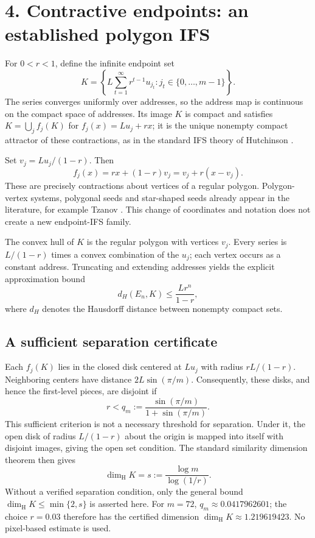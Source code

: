 \documentclass[11pt,a4paper]{article}
\newcommand{\dimH}{\dim_{\mathrm H}}
\newcommand{\sectiontitle}[1]{\section*{\sffamily\color{ink}#1}}
\begin{document}
\newpage
\sectiontitle{4. Contractive endpoints: an established polygon IFS}
For $0<r<1$, define the infinite endpoint set
\begin{equation}
K=\left\{L\sum_{t=1}^{\infty}r^{t-1}u_{j_t}:
j_t\in\{0,\ldots,m-1\}\right\}.
\end{equation}
The series converges uniformly over addresses, so the address map is
continuous on the compact space of addresses. Its image $K$ is compact and
satisfies $K=\bigcup_j f_j(K)$ for $f_j(x)=Lu_j+rx$; it is the unique
nonempty compact attractor of these contractions, as in the standard
IFS theory of Hutchinson \cite{hutchinson}.

Set $v_j=Lu_j/(1-r)$. Then
\begin{equation}
f_j(x)=rx+(1-r)v_j=v_j+r(x-v_j).
\end{equation}
These are precisely contractions about vertices of a regular polygon.
Polygon-vertex systems, polygonal seeds and star-shaped seeds already
appear in the literature, for example Tzanov \cite{tzanov}. This change
of coordinates and notation does not create a new endpoint-IFS family.

The convex hull of $K$ is the regular polygon with vertices $v_j$.
Every series is $L/(1-r)$ times a convex combination of the $u_j$;
each vertex occurs as a constant address. Truncating and extending
addresses yields the explicit approximation bound
\begin{equation}
d_H(E_n,K)\le\frac{Lr^n}{1-r},
\end{equation}
where $d_H$ denotes the Hausdorff distance between nonempty compact sets.

\subsection*{A sufficient separation certificate}
Each $f_j(K)$ lies in the closed disk centered at $Lu_j$ with radius
$rL/(1-r)$. Neighboring centers have distance $2L\sin(\pi/m)$.
Consequently, these disks, and hence the first-level pieces, are disjoint if
\begin{equation}
r<q_m:=\frac{\sin(\pi/m)}{1+\sin(\pi/m)}.
\end{equation}
This sufficient criterion is not a necessary threshold for separation.
Under it, the open disk of radius $L/(1-r)$ about the origin is mapped into
itself with disjoint images, giving the open set condition. The standard
similarity dimension theorem \cite{hutchinson} then gives
\begin{equation}
\dimH K=s:=\frac{\log m}{\log(1/r)}.
\end{equation}
Without a verified separation condition, only the general bound
$\dimH K\le\min\{2,s\}$ is asserted here. For $m=72$,
$q_m\approx0.0417962601$; the choice $r=0.03$ therefore has the certified
dimension $\dimH K\approx1.219619423$. No pixel-based estimate is used.
\end{document}
